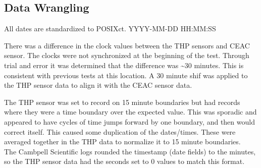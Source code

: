 \documentclass[
  letterpaper,
  DIV=11,
  numbers=noendperiod]{scrartcl}
\begin{document}
\hypertarget{data-wrangling}{%
\subsection{Data Wrangling}\label{data-wrangling}}

All dates are standardized to POSIXct. YYYY-MM-DD HH:MM:SS

There was a difference in the clock values between the THP sensors and
CEAC sensor. The clocks were not synchronized at the beginning of the
test. Through trial and error it was determined that the difference was
\textasciitilde30 minutes. This is consistent with previous tests at
this location. A 30 minute shif was applied to the THP sensor data to
align it with the CEAC sensor data.

The THP sensor was set to record on 15 minute boundaries but had records
where they were a time boundary over the expected value. This was
sporadic and appeared to have cycles of time jumps forward by one
boundary, and then would correct itself. This caused some duplication of
the dates/times. These were averaged together in the THP data to
normalize it to 15 minute boundaries.\\
The Cambpell Scientific logs rounded the timestamp (date fields) to the
minutes, so the THP sensor data had the seconds set to 0 values to match
this format.
\end{document}

